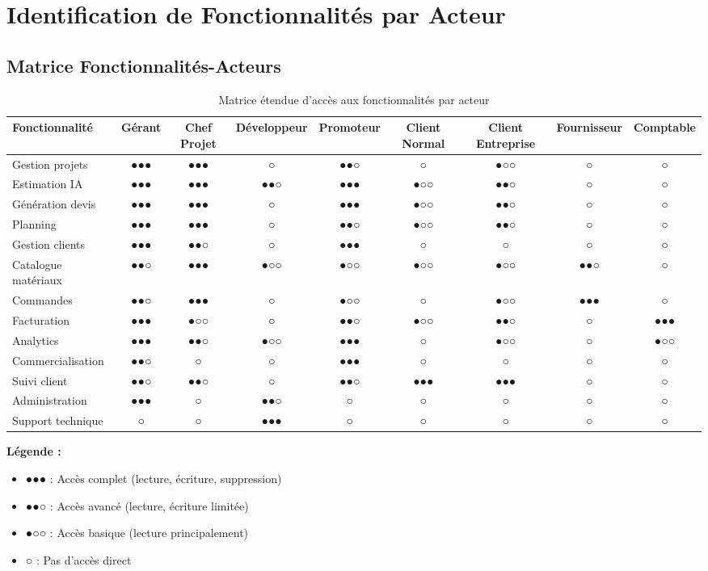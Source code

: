 \section{Identification de Fonctionnalités par Acteur}

\subsection{Matrice Fonctionnalités-Acteurs}

\begin{table}[H]
\centering
\small
\begin{tabular}{|l|c|c|c|c|c|c|c|c|}
\hline
\textbf{Fonctionnalité} & \textbf{Gérant} & \textbf{Chef Projet} & \textbf{Développeur} & \textbf{Promoteur} & \textbf{Client Normal} & \textbf{Client Entreprise} & \textbf{Fournisseur} & \textbf{Comptable} \\
\hline
Gestion projets & ●●● & ●●● & ○ & ●●○ & ○ & ●○○ & ○ & ○ \\
\hline
Estimation IA & ●●● & ●●● & ●●○ & ●●● & ●○○ & ●●○ & ○ & ○ \\
\hline
Génération devis & ●●● & ●●● & ○ & ●●● & ●○○ & ●●○ & ○ & ○ \\
\hline
Planning & ●●● & ●●● & ○ & ●●○ & ●○○ & ●●○ & ○ & ○ \\
\hline
Gestion clients & ●●● & ●●○ & ○ & ●●● & ○ & ○ & ○ & ○ \\
\hline
Catalogue matériaux & ●●○ & ●●● & ●○○ & ●○○ & ●○○ & ●○○ & ●●○ & ○ \\
\hline
Commandes & ●●○ & ●●● & ○ & ●○○ & ○ & ●○○ & ●●● & ○ \\
\hline
Facturation & ●●● & ●○○ & ○ & ●●○ & ●○○ & ●●○ & ○ & ●●● \\
\hline
Analytics & ●●● & ●●○ & ●○○ & ●●● & ○ & ●○○ & ○ & ●○○ \\
\hline
Commercialisation & ●●○ & ○ & ○ & ●●● & ○ & ○ & ○ & ○ \\
\hline
Suivi client & ●●○ & ●●○ & ○ & ●●○ & ●●● & ●●● & ○ & ○ \\
\hline
Administration & ●●● & ○ & ●●○ & ○ & ○ & ○ & ○ & ○ \\
\hline
Support technique & ○ & ○ & ●●● & ○ & ○ & ○ & ○ & ○ \\
\hline
\end{tabular}
\caption{Matrice étendue d'accès aux fonctionnalités par acteur}
\label{tab:matrice_fonctionnalites_etendue}
\end{table}

\textbf{Légende :}
\begin{itemize}
    \item ●●● : Accès complet (lecture, écriture, suppression)
    \item ●●○ : Accès avancé (lecture, écriture limitée)
    \item ●○○ : Accès basique (lecture principalement)
    \item ○ : Pas d'accès direct
\end{itemize}


